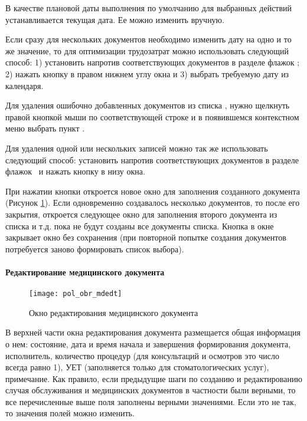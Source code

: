 В качестве плановой даты выполнения по умолчанию для выбранных действий устанавливается текущая дата. Ее можно изменить вручную.

\begin{prim}
 Если сразу для нескольких документов необходимо изменить дату на одно и то же значение, то для оптимизации трудозатрат можно использовать следующий способ: 1) установить напротив соответствующих документов в разделе  флажок \putx ; 2) нажать кнопку  в правом нижнем углу окна  и 3) выбрать требуемую дату из календаря.
\end{prim} 
 
Для удаления ошибочно добавленных документов из списка , нужно щелкнуть правой кнопкой мыши по соответствующей строке и в появившемся контекстном меню выбрать пункт .

\begin{prim}
 Для удаления одной или нескольких записей можно так же использовать следующий способ: установить напротив соответствующих документов в разделе  флажок \putx~и нажать кнопку  в низу окна.
\end{prim} 
 
При нажатии кнопки   откроется новое окно для заполнения созданного документа (Рисунок \ref{img_pol_obr_mdedt}). Если одновременно создавалось несколько документов, то после его закрытия, откроется следующее окно для заполнения второго документа из списка и т.д. пока не будут созданы все документы списка. Кнопка  в окне  закрывает окно без сохранения (при повторной попытке создания документов потребуется заново формировать список выбора).

\paragraph{Редактирование медицинского документа} \label{pol_obr_mdedt}

\begin{figure}[ht]\centering
 \texttt{[image: pol\_obr\_mdedt]}
 \caption{Окно редактирования медицинского документа}
 \label{img_pol_obr_mdedt}
\end{figure}

В верхней части окна редактирования документа размещается общая информация о нем: состояние, дата и время начала и завершения формирования документа, исполнитель, количество процедур (для консультаций и осмотров это число всегда равно 1), УЕТ (заполняется только для стоматологических услуг), примечание. Как правило, если предыдущие шаги по созданию и редактированию случая обслуживания и медицинских документов в частности были верными, то все перечисленные выше поля заполнены верными значениями. Если это не так, то значения полей можно изменить.

